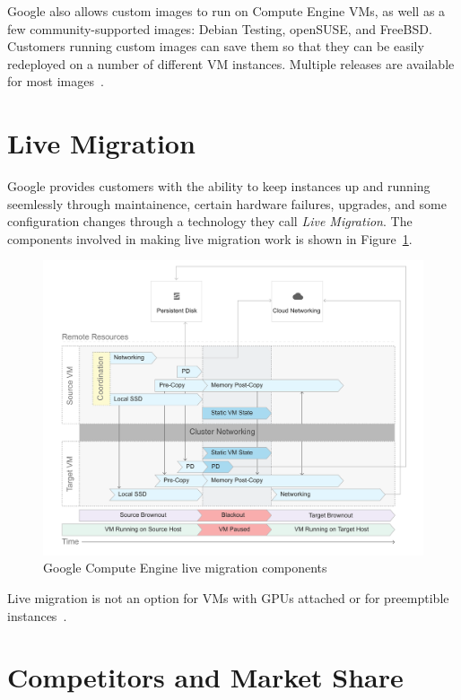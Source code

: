 Google also allows custom images to run on Compute Engine VMs, as well
as a few community-supported images: Debian Testing, openSUSE, and
FreeBSD. Customers running custom images can save them so that they
can be easily redeployed on a number of different VM
instances. Multiple releases are available for most
images~\cite{hid-sp18-419-gce-images}.


\section{Live Migration}
Google provides customers with the ability to keep instances up and
running seemlessly through maintainence, certain hardware failures,
upgrades, and some configuration changes through a technology they
call \textit{Live Migration}. The components
involved in making live migration work is shown in
Figure~\ref{f:live-migration}.

\begin{figure}[!ht]
  \centering\includegraphics[width=\columnwidth]{images/live-migration.pdf}
  \caption{Google Compute Engine live migration components~\cite{hid-sp18-419-gce-live-migration}}\label{f:live-migration}
\end{figure}

Live migration is not an option for VMs
with GPUs attached or for preemptible
instances~\cite{hid-sp18-419-gce-live-migration}.

\section{Competitors and Market Share}

